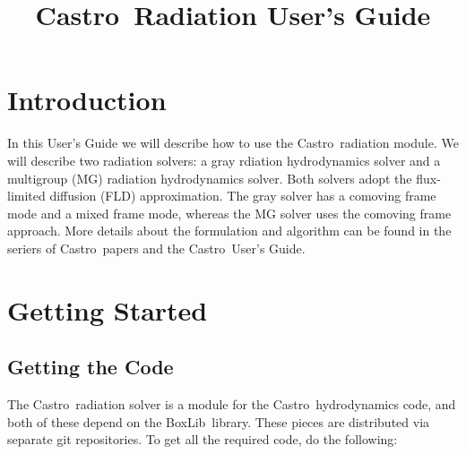 \documentclass[11pt,letterpaper]{article}
\newcommand{\castro}{{\sf Castro}}
\newcommand{\boxlib}{{\sf BoxLib}}
\begin{document}
\title{\castro\ Radiation User's Guide}
\maketitle

\section{Introduction}

In this User's Guide we will describe how to use the \castro\ radiation
module.  We will describe two radiation solvers: a gray rdiation
hydrodynamics solver and a multigroup (MG) radiation hydrodynamics
solver.  Both solvers adopt the flux-limited diffusion (FLD)
approximation.  The gray solver has a comoving frame mode and a mixed
frame mode, whereas the MG solver uses the comoving frame approach.
More details about the formulation and algorithm can be found in the
seriers of \castro\ papers and the \castro\ User's Guide.

\section{Getting Started}

\subsection{Getting the Code}

The \castro\ radiation solver is a module for the \castro\ hydrodynamics code,
and both of these depend on the \boxlib\ library.  These pieces are
distributed via separate git repositories.  To get all the required code,
do the following:
\end{document}
